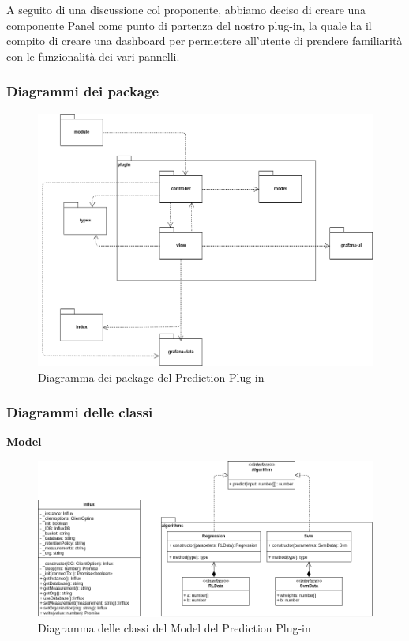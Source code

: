 A seguito di una discussione col proponente, abbiamo deciso di creare una componente Panel come punto di partenza del nostro plug-in, la quale ha il compito di creare una dashboard per permettere all’utente di prendere familiarità con le funzionalità dei vari pannelli.

\subsubsection{Diagrammi dei package}
\begin{figure}[H]
\centering
\includegraphics[scale=0.40]{../../Diagrams/Package_diagrams/plugin_design_pattern.png}
\caption{Diagramma dei package del Prediction Plug-in}
\end{figure}

\subsubsection{Diagrammi delle classi}
\textbf{Model}
\begin{figure}[H]
\centering
\includegraphics[scale=0.45]{../../Diagrams/Classes_diagrams/plugin_model.png}
\caption{Diagramma delle classi del Model del Prediction Plug-in}
\end{figure}

